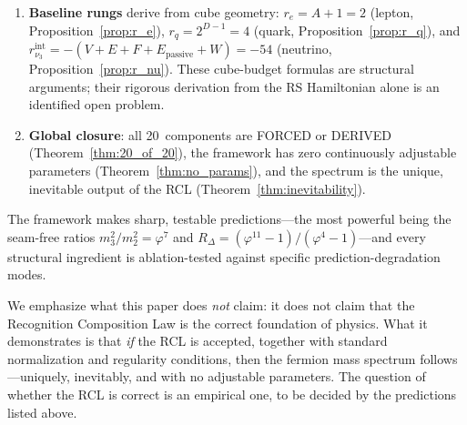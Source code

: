 \documentclass[11pt,a4paper]{article}
\theoremstyle{definition}
\theoremstyle{remark}
\newcommand{\phig}{\varphi}
\newcommand{\Epass}{E_{\mathrm{passive}}}
\begin{document}
\begin{enumerate}[nosep]
  \item \textbf{Baseline rungs} derive from cube geometry:
    $r_e = A + 1 = 2$ (lepton, Proposition~\ref{prop:r_e}),
    $r_q = 2^{D-1} = 4$ (quark, Proposition~\ref{prop:r_q}),
    and $r_{\nu_3}^{\mathrm{int}} = -(V+E+F+\Epass+W) = -54$
    (neutrino, Proposition~\ref{prop:r_nu}).  These cube-budget
    formulas are structural arguments; their rigorous derivation from
    the RS Hamiltonian alone is an identified open problem.

  \item \textbf{Global closure}: all 20~components are FORCED or DERIVED
    (Theorem~\ref{thm:20_of_20}), the framework has zero continuously
    adjustable parameters (Theorem~\ref{thm:no_params}), and the spectrum is
    the unique, inevitable output of the RCL
    (Theorem~\ref{thm:inevitability}).
\end{enumerate}

The framework makes sharp, testable predictions---the most powerful being the
seam-free ratios $m_3^2/m_2^2 = \phig^7$ and
$R_\Delta = (\phig^{11}-1)/(\phig^4-1)$---and every structural ingredient
is ablation-tested against specific prediction-degradation modes.

We emphasize what this paper does \emph{not} claim: it does not claim that the
Recognition Composition Law is the correct foundation of physics.  What it
demonstrates is that \emph{if} the RCL is accepted, together with standard
normalization and regularity conditions, then the fermion mass spectrum
follows---uniquely, inevitably, and with no adjustable parameters.
The question of whether the RCL is correct is an empirical one, to be
decided by the predictions listed above.

\end{document}
